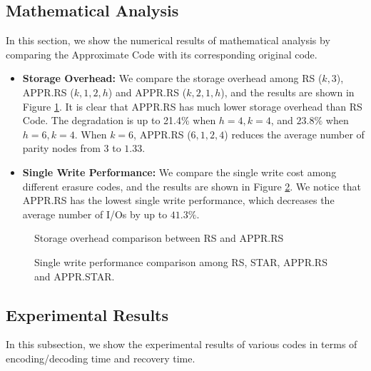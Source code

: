 \documentclass[sigconf]{acmart}
\begin{document}
\subsection{Mathematical Analysis}
In this section, we show the numerical results of mathematical analysis by comparing the Approximate Code with its corresponding original code.

\begin{itemize}
    \item \textbf{Storage Overhead:} We compare the storage overhead among RS ($k,3$), APPR.RS ($k,1,2,h$) and APPR.RS ($k,2,1,h$), and the results are shown in Figure \ref{fig-Storage}. It is clear that APPR.RS has much lower storage overhead than RS Code. The degradation is up to 21.4\% when $h=4, k=4$, and $23.8\%$ when $h=6, k=4$. When $k=6$, APPR.RS ($6,1,2,4$) reduces the average number of parity nodes from $3$ to $1.33$.
    \item \textbf{Single Write Performance:} We compare the single write cost among different erasure codes, and the results are shown in Figure \ref{fig-Sig-Write}. We notice that APPR.RS has the lowest single write performance, which decreases the average number of I/Os by up to  $41.3\%$. 
\end{itemize}

\begin{figure}[ht]
\caption{Storage overhead comparison between RS and APPR.RS}\label{fig-Storage}
\end{figure}

\begin{figure}[ht]
\caption{Single write performance comparison among RS, STAR, APPR.RS and APPR.STAR.}\label{fig-Sig-Write}
\end{figure}

\subsection{Experimental Results}
In this subsection, we show the experimental results of various codes in terms of encoding/decoding time and recovery time.
\end{document}
